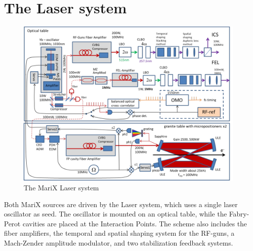 \section{The Laser system}
\begin{figure}
	\centering
	\includegraphics[width=1\linewidth]{images/pm.pdf}
	\caption{The MariX Laser system}
	\label{fig:photonic}
\end{figure}
Both MariX sources are driven by the Laser system, which uses a single laser oscillator as seed. The oscillator is mounted on an optical table, while the Fabry-Perot cavities are placed at the Interaction Points. The scheme also includes the fiber amplifiers, the temporal and spatial shaping system for the RF-guns, a Mach-Zender amplitude modulator, and two stabilization feedback systems.

